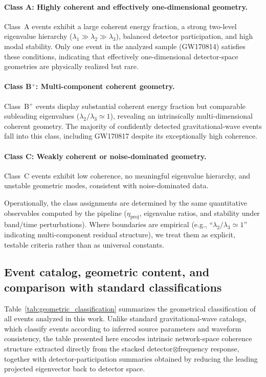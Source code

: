\documentclass[11pt,a4paper]{article}
\begin{document}
\paragraph{Class A: Highly coherent and effectively one-dimensional geometry.}
Class~A events exhibit a large coherent energy fraction, a strong two-level eigenvalue
hierarchy ($\lambda_1 \gg \lambda_2 \gg \lambda_3$), balanced detector participation, and
high modal stability.
Only one event in the analyzed sample (GW170814) satisfies these conditions, indicating
that effectively one-dimensional detector-space geometries are physically realized but
rare.

\paragraph{Class B$^+$: Multi-component coherent geometry.}
Class~B$^+$ events display substantial coherent energy fraction but comparable subleading
eigenvalues ($\lambda_2/\lambda_3 \simeq 1$), revealing an intrinsically multi-dimensional
coherent geometry.
The majority of confidently detected gravitational-wave events fall into this class,
including GW170817 despite its exceptionally high coherence.

\paragraph{Class C: Weakly coherent or noise-dominated geometry.}
Class~C events exhibit low coherence, no meaningful eigenvalue hierarchy, and unstable
geometric modes, consistent with noise-dominated data.

Operationally, the class assignments are determined by the same quantitative observables computed by the pipeline
($\eta_{\mathrm{proj}}$, eigenvalue ratios, and stability under band/time perturbations). Where boundaries are empirical
(e.g., ``$\lambda_2/\lambda_3\simeq 1$'' indicating multi-component residual structure), we treat them as explicit, testable
criteria rather than as universal constants.

\subsection{Event catalog, geometric content, and comparison with standard classifications}

Table~\ref{tab:geometric_classification} summarizes the geometrical classification of all
events analyzed in this work.
Unlike standard gravitational-wave catalogs, which classify events according to inferred
source parameters and waveform consistency, the table presented here encodes intrinsic
network-space coherence structure extracted directly from the stacked detector$\otimes$frequency
response, together with detector-participation summaries obtained by reducing the leading
projected eigenvector back to detector space.
\end{document}
